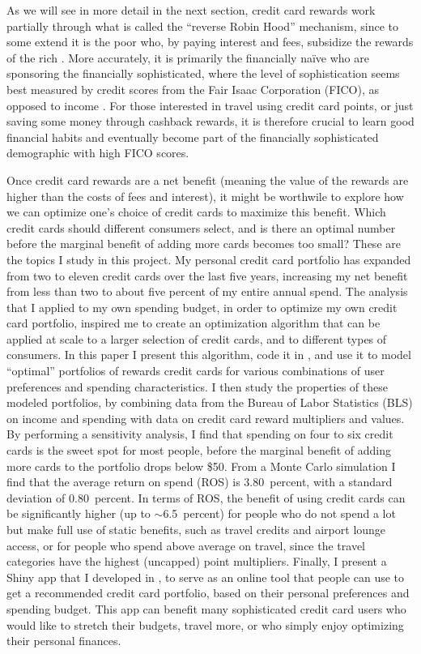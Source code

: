 As we will see in more detail in the next section, credit card rewards work partially through what is called the ``reverse Robin Hood'' mechanism, since to some extend it is the poor who, by paying interest and fees, subsidize the rewards of the rich \citep{wsj:2010}.
More accurately, it is primarily the financially na\"{i}ve who are sponsoring the financially sophisticated, where the level of sophistication seems best measured by credit scores from the Fair Isaac Corporation (FICO), as opposed to income \citep*{agaretal:2023}.
For those interested in travel using credit card points, or just saving some money through cashback rewards, it is therefore crucial to learn good financial habits and eventually become part of the financially sophisticated demographic with high FICO scores. 

Once credit card rewards are a net benefit (meaning the value of the rewards are higher than the costs of fees and interest), it might be worthwile to explore how we can optimize one's choice of credit cards to maximize this benefit. Which credit cards should different consumers select, and is there an optimal number before the marginal benefit of adding more cards becomes too small?  
These are the topics I study in this project. 
My personal credit card portfolio has expanded from two to eleven credit cards over the last five years, increasing my net benefit from less than two to about five percent of my entire annual spend.
The analysis that I applied to my own spending budget, in order to optimize my own credit card portfolio, inspired me to create an optimization algorithm that can be applied at scale to a larger selection of credit cards, and to different types of consumers. 
In this paper I present this algorithm, code it in \sR, and use it to model ``optimal'' portfolios of rewards credit cards for various combinations of user preferences and spending characteristics. 
I then study the properties of these modeled portfolios, by combining data from the Bureau of Labor Statistics (BLS) on income and spending with data on credit card reward multipliers and values. 
By performing a sensitivity analysis, I find that spending on four to six credit cards is the sweet spot for most people, before the marginal benefit of adding more cards to the portfolio drops below \$50. 
From a Monte Carlo simulation I find that the average return on spend (ROS) is 3.80~percent, with a standard deviation of 0.80~percent. 
In terms of ROS, the benefit of using credit cards can be significantly higher (up to $\sim$6.5~percent) for people who do not spend a lot but make full use of static benefits, such as travel credits and airport lounge access, or for people who spend above average on travel, since the travel categories have the highest (uncapped) point multipliers. 
Finally, I present a \textsf{Shiny} app that I developed in \sR, to serve as an online tool that people can use to get a recommended credit card portfolio, based on their personal preferences and spending budget.
This app can benefit many sophisticated credit card users who would like to stretch their budgets, travel more, or who simply enjoy optimizing their personal finances.

